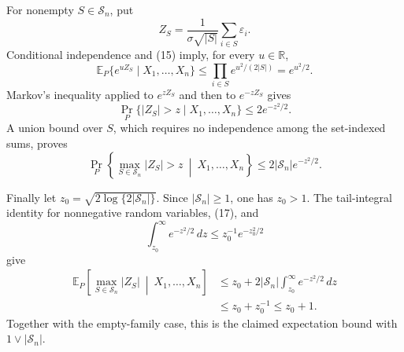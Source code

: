 For nonempty \(S\in\mathscr S_n\), put
\[
 Z_S=\frac1{\sigma\sqrt{|S|}}\sum_{i\in S}\varepsilon_i.
\]
Conditional independence and (15) imply, for every \(u\in\mathbb R\),
\[
 \mathbb E_P\{e^{uZ_S}\mid X_1,\ldots,X_n\}
 \le\prod_{i\in S}e^{u^2/(2|S|)}=e^{u^2/2}. \tag{16}
\]
Markov's inequality applied to \(e^{zZ_S}\) and then to \(e^{-zZ_S}\) gives
\[
 \Pr_P\{|Z_S|>z\mid X_1,\ldots,X_n\}\le2e^{-z^2/2}.
\]
A union bound over \(S\), which requires no independence among the set-indexed sums, proves
\[
 \Pr_P\left\{\max_{S\in\mathscr S_n}|Z_S|>z
 \ \middle|\ X_1,\ldots,X_n\right\}
 \le2|\mathscr S_n|e^{-z^2/2}. \tag{17}
\]

Finally let \(z_0=\sqrt{2\log\{2|\mathscr S_n|\}}\). Since \(|\mathscr S_n|\ge1\), one has \(z_0>1\). The tail-integral identity for nonnegative random variables, (17), and
\[
 \int_{z_0}^{\infty}e^{-z^2/2}\,dz\le z_0^{-1}e^{-z_0^2/2}
\]
give
\[
 \begin{aligned}
 \mathbb E_P\left[\max_{S\in\mathscr S_n}|Z_S|
 \ \middle|\ X_1,\ldots,X_n\right]
 &\le z_0+2|\mathscr S_n|\int_{z_0}^{\infty}e^{-z^2/2}\,dz\\
 &\le z_0+z_0^{-1}\le z_0+1.
 \end{aligned}
\]
Together with the empty-family case, this is the claimed expectation bound with \(1\vee|\mathscr S_n|\).